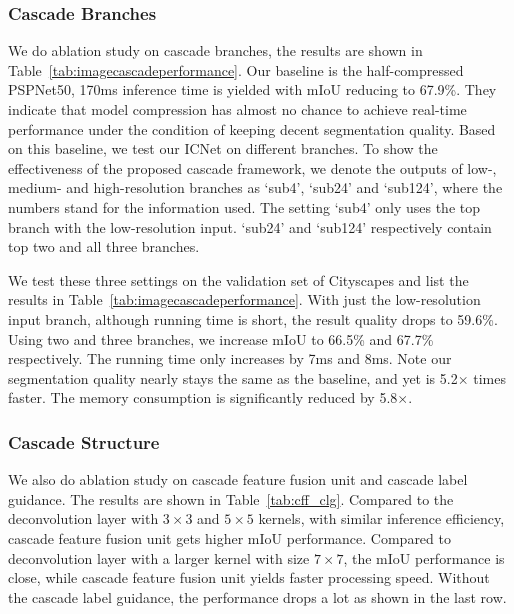 \documentclass[runningheads]{llncs}
\begin{document}
\subsubsection{Cascade Branches}
We do ablation study on cascade branches, the results are shown in Table~\ref{tab:imagecascadeperformance}. Our baseline is the half-compressed PSPNet50, 170ms inference time is yielded with mIoU reducing to 67.9\%. They indicate that model compression has almost no chance to achieve real-time performance under the condition of keeping decent segmentation quality. Based on this baseline, we test our ICNet on different branches. To show the effectiveness of the proposed cascade framework, we denote the outputs of low-, medium- and high-resolution branches as `sub4', `sub24' and `sub124', where the numbers stand for the information used. The setting `sub4' only uses the top branch with the low-resolution input. `sub24' and `sub124' respectively contain top two and all three branches.

We test these three settings on the validation set of Cityscapes and list the results in Table~\ref{tab:imagecascadeperformance}. With just the low-resolution input branch, although running time is short, the result quality drops to 59.6\%. Using two and three branches, we increase mIoU to 66.5\% and 67.7\% respectively. The running time only increases by 7ms and 8ms. Note our segmentation quality nearly stays the same as the baseline, and yet is 5.2$\times$ times faster. The memory consumption is significantly reduced by 5.8$\times$.

\subsubsection{Cascade Structure}
We also do ablation study on cascade feature fusion unit and cascade label guidance. The results are shown in Table~\ref{tab:cff_clg}. Compared to the deconvolution layer with $3 \times 3$ and $5 \times 5$ kernels, with similar inference efficiency, cascade feature fusion unit gets higher mIoU performance. Compared to deconvolution layer with a larger kernel with size $7 \times 7$, the mIoU performance is close, while cascade feature fusion unit yields faster processing speed. Without the cascade label guidance, the performance drops a lot as shown in the last row.
\end{document}
